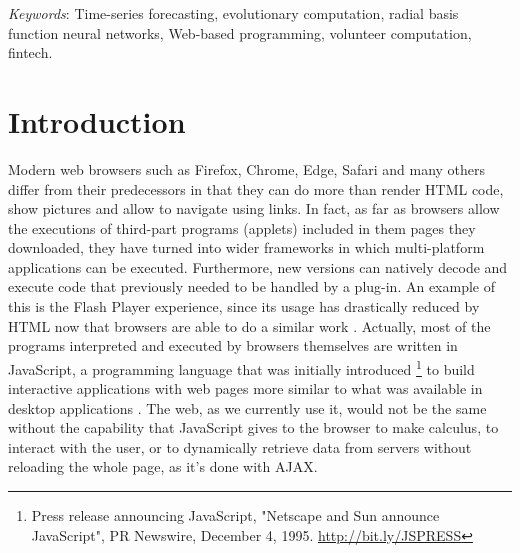 \documentclass{article}
\begin{document}
%
\textit{Keywords}: Time-series forecasting, evolutionary computation, radial basis function neural networks, Web-based programming, volunteer computation, fintech.

\section{Introduction}
Modern web browsers such as Firefox, Chrome, Edge, Safari and many
others differ from their predecessors in that they can do more than
render HTML code, show pictures and allow to navigate using links. In
fact, as far as browsers allow the executions of third-part programs
(applets) included in them
pages they downloaded, they have turned into wider
frameworks in which multi-platform applications can be executed.
Furthermore, new versions can natively decode and execute code that previously needed to be handled by a plug-in. An example of this is the Flash Player experience, since its usage has drastically reduced by HTML now that browsers are able to do a similar work \cite{Winokur11}.
Actually, most of the programs interpreted and executed by browsers themselves are written in JavaScript, a programming language that was initially introduced \footnote{Press release announcing JavaScript, "Netscape and Sun announce JavaScript", PR Newswire, December 4, 1995. \url{http://bit.ly/JSPRESS}} to build interactive applications
with web pages more similar to what was available in desktop
applications \cite{Rauschmayer04}. %
The web, as we currently use it, would not be the same without the
capability that JavaScript gives to the browser to make calculus,
to interact with the user, or to dynamically retrieve data from servers
without reloading the whole page, as it's done with AJAX\cite{powell2008ajax}. %
\end{document}
